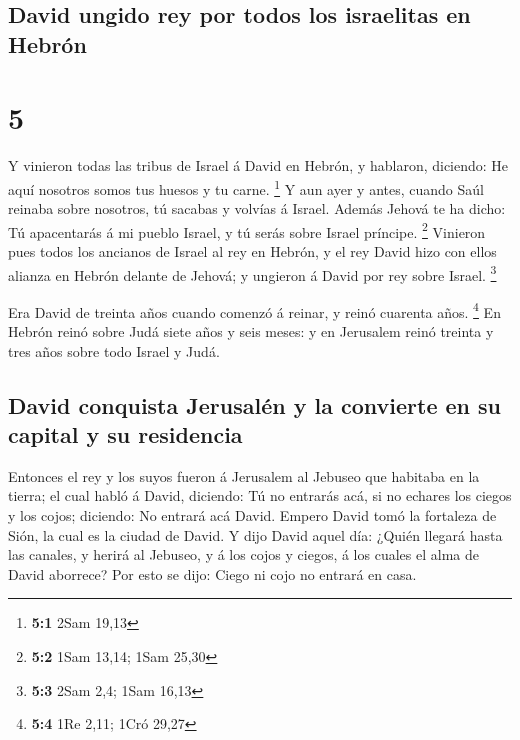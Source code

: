\hypertarget{david-ungido-rey-por-todos-los-israelitas-en-hebruxf3n}{%
\subsection{David ungido rey por todos los israelitas en
Hebrón}\label{david-ungido-rey-por-todos-los-israelitas-en-hebruxf3n}}

\hypertarget{section-4}{%
\section{5}\label{section-4}}

 Y vinieron todas las tribus de Israel á David en Hebrón, y
hablaron, diciendo: He aquí nosotros somos tus huesos y tu carne.
\footnote{\textbf{5:1} 2Sam 19,13}  Y aun ayer y antes,
cuando Saúl reinaba sobre nosotros, tú sacabas y volvías á Israel.
Además Jehová te ha dicho: Tú apacentarás á mi pueblo Israel, y tú serás
sobre Israel príncipe. \footnote{\textbf{5:2} 1Sam 13,14; 1Sam 25,30}
 Vinieron pues todos los ancianos de Israel al rey en
Hebrón, y el rey David hizo con ellos alianza en Hebrón delante de
Jehová; y ungieron á David por rey sobre Israel. \footnote{\textbf{5:3}
  2Sam 2,4; 1Sam 16,13}

 Era David de treinta años cuando comenzó á reinar, y reinó
cuarenta años. \footnote{\textbf{5:4} 1Re 2,11; 1Cró 29,27} 
En Hebrón reinó sobre Judá siete años y seis meses: y en Jerusalem reinó
treinta y tres años sobre todo Israel y Judá.

\hypertarget{david-conquista-jerusaluxe9n-y-la-convierte-en-su-capital-y-su-residencia}{%
\subsection{David conquista Jerusalén y la convierte en su capital y su
residencia}\label{david-conquista-jerusaluxe9n-y-la-convierte-en-su-capital-y-su-residencia}}

 Entonces el rey y los suyos fueron á Jerusalem al Jebuseo
que habitaba en la tierra; el cual habló á David, diciendo: Tú no
entrarás acá, si no echares los ciegos y los cojos; diciendo: No entrará
acá David.  Empero David tomó la fortaleza de Sión, la cual
es la ciudad de David.  Y dijo David aquel día: ¿Quién
llegará hasta las canales, y herirá al Jebuseo, y á los cojos y ciegos,
á los cuales el alma de David aborrece? Por esto se dijo: Ciego ni cojo
no entrará en casa.


